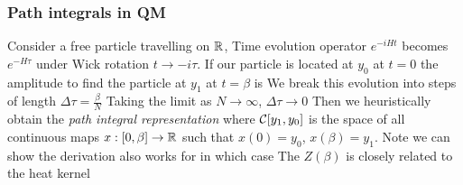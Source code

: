 \documentclass{article}
\begin{document}
\subsubsection*{Path integrals in QM}
Consider a free particle travelling on $\mathbb{R}$, Time evolution operator $e^{-iHt}$ becomes $e^{-H\tau}$ under Wick rotation $t\to -i\tau$. If our particle is located at $y_0$ at $t=0$ the amplitude to find the particle at $y_1$ at $t=\beta$ is 
We break this evolution into steps of length $\Delta \tau = \frac{\beta}{N}$ 
Taking the limit as $N\to\infty$, $\Delta \tau \to 0$
Then we heuristically obtain the \emph{path integral representation}
where $\mathcal{C} \lbrack y_1 , y_0 \rbrack $ is the space of all continuous maps $ x : \lbrack 0,\beta \rbrack \to \mathbb{R} $ such that $x(0)=y_0$, $x(\beta)=y_1$. Note we can show the derivation also works for
in which case 
The  $Z(\beta)$ is closely related to the heat kernel 

\end{document}
